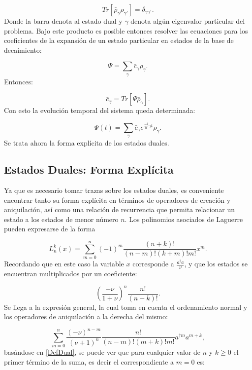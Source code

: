 \documentclass[a4paper,10pt]{report}
\begin{document}
\begin{equation}
Tr[\bar{\rho}_{\gamma}\rho_{\gamma'}] = \delta_{\gamma\gamma'}.
\end{equation} Donde la barra denota al estado dual y $\gamma$ denota algún eigenvalor particular del problema. Bajo este producto es posible entonces resolver las ecuaciones para los coeficientes de la expansión de un estado particular en estados de la base de decaimiento:

\begin{equation}
\Psi = \sum_{\gamma}\bar{c}_\gamma \rho_\gamma.
\end{equation} Entonces:

\begin{equation}
\bar{c}_\gamma = Tr[\Psi\bar{\rho}_{\gamma}].
\end{equation} Con esto la evolución temporal del sistema queda determinada:

\begin{equation}
\Psi(t) = \sum_\gamma \bar{c}_\gamma e^{\frac{-i}{\hbar} \gamma t} \rho_{\gamma}.
\end{equation} Se trata ahora la forma explícita de los estados duales.

\subsection{Estados Duales: Forma Explícita}

Ya que es necesario tomar trazas sobre los estados duales, es conveniente encontrar tanto su forma explícita en términos de operadores de creación y aniquilación, así como una relación de recurrencia que permita relacionar un estado a los estados de menor número $n$. Los polinomios asociados de Laguerre pueden expresarse de la forma\cite{ArfkenMM}

\begin{equation}\label{DefLaguerre}
L_n^k(x) = \sum_{m=0}^n (-1)^m \frac{(n+k)!}{(n-m)!(k+m)!m!} x^m.
\end{equation} Recordando que en este caso la variable $x$ corresponde a $\frac{a^\dagger a}{\nu}$, y que los estados se encuentran multiplicados por un coeficiente:

\begin{equation}
(\frac{-\nu}{1+\nu})^n \frac{n!}{(n+k)!}.
\end{equation}Se llega a la expresión general, la cual toma en cuenta el ordenamiento normal y los operadores de aniquilación a la derecha del mismo:

\begin{equation}\label{DefDual}
\sum_{m=0}^n \frac{(-\nu)^{n-m}}{(\nu+1)^n} \frac{n!}{(n-m)!(m+k)!m!} a^{\dagger m}a^{m+k},
\end{equation}basándose en \ref{DefDual}, se puede ver que para cualquier valor de $n$ y $k \geq 0$ el primer término de la suma, es decir el correspondiente a $m=0$ es:
\end{document}
